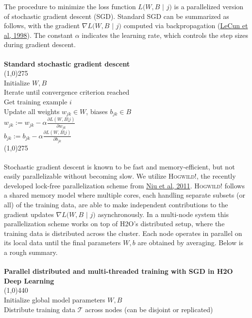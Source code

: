 \documentclass[11pt]{article}
\begin{document}
The procedure to minimize the loss function $L(W,B$ $|$ $j)$ is a parallelized version of stochastic gradient descent (SGD). Standard SGD can be summarized as follows, with the gradient $\nabla L(W,B$ $|$ $j)$ computed via backpropagation (\href{http://yann.lecun.com/exdb/publis/pdf/lecun-98b.pdf}{LeCun et al, 1998}). The constant $\alpha$ indicates the learning rate, which controls the step sizes during gradient descent.
\\
\\
{\bf{\footnotesize{Standard stochastic gradient descent}}}
\\
\line(1,0){275}
\\
Initialize $W,B$ 
\\
Iterate until convergence criterion reached
\\
\indent Get training example $i$
\\
\indent Update all weights $w_{jk} \in W$, biases $b_{jk} \in B$
\\
\indent \indent $w_{jk} := w_{jk} - \alpha \frac{\partial L(W,B | j)}{\partial w_{jk}}$
\\
\indent \indent $b_{jk} := b_{jk} - \alpha \frac{\partial L(W,B | j)}{\partial b_{jk}}$
\\
\line(1,0){275}
\\
\\
Stochastic gradient descent is known to be fast and memory-efficient, but not easily parallelizable without becoming slow. We utilize \textsc{Hogwild!}, the recently developed lock-free parallelization scheme from \href{http://i.stanford.edu/hazy/papers/hogwild-nips.pdf}{Niu et al, 2011}. \textsc{Hogwild!} follows a shared memory model where multiple cores, each handling separate subsets (or all) of the training data, are able to make independent contributions to the gradient updates $\nabla L(W,B$ $ |$ $j)$ asynchronously. In a multi-node system this parallelization scheme works on top of H2O's distributed setup, where the training data is distributed across the cluster. Each node operates in parallel on its local data until the final parameters $W,b$ are obtained by averaging. Below is a rough summary.
\\
\\
\noindent
{\bf{\footnotesize{Parallel distributed and multi-threaded training with SGD in H2O Deep Learning}}}
\\
\line(1,0){440}
\\
Initialize global model parameters $W,B$
\\
Distribute training data $\mathcal{T}$ across nodes (can be disjoint or replicated)
\end{document}
